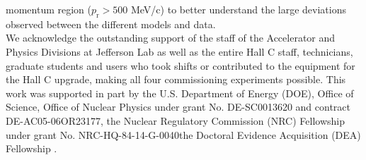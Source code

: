 momentum region ($p_{\mathrm{r}}>500$ MeV/c) to better understand the large deviations observed between the different models and data.\DIFaddbegin \\
\DIFaddend \indent We acknowledge the outstanding support of the staff of the Accelerator and Physics Divisions at Jefferson Lab
as well as the entire Hall C staff, technicians, graduate students and users who took shifts or contributed
to the equipment for the Hall C upgrade, making all four commissioning experiments possible. \DIFaddbegin {}\DIFaddend This work was supported in part by the U.S. Department of Energy (DOE), Office of Science, Office of Nuclear Physics
under grant No. DE-SC0013620 and contract DE-AC05-06OR23177, the Nuclear Regulatory Commission (NRC) Fellowship
under grant No. NRC-HQ-84-14-G-0040\DIFdelbegin {}\DIFdelend \DIFaddbegin \DIFadd{, }\DIFaddend the Doctoral Evidence Acquisition (DEA) Fellowship \DIFaddbegin {}\DIFaddend .

